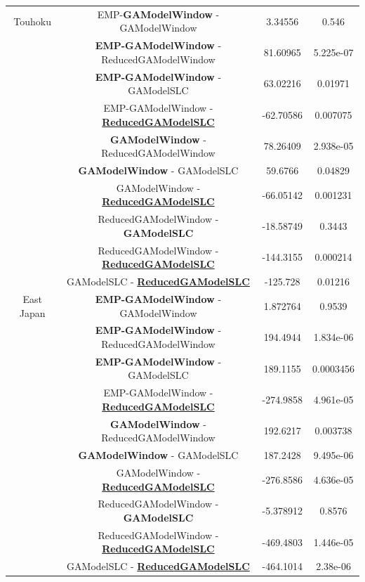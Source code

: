 \begin{table}[!htb]
\begin{center}
\begin{tabular}{|c|c|c|c|}
			\hline
			Touhoku & EMP-\textbf{GAModelWindow} - GAModelWindow &
			3.34556 & 0.546\\
			& \textbf{EMP-GAModelWindow} - ReducedGAModelWindow &
			81.60965 & 5.225e-07\\
			&	\textbf{EMP-GAModelWindow} - GAModelSLC &
			63.02216 &0.01971\\
			& EMP-GAModelWindow - \underline{\textbf{ReducedGAModelSLC}} &
			-62.70586 & 0.007075\\
			& \textbf{GAModelWindow} - ReducedGAModelWindow & 
			78.26409 & 2.938e-05\\
			& \textbf{GAModelWindow} - GAModelSLC &
			59.6766 & 0.04829\\
			& GAModelWindow - \underline{\textbf{ReducedGAModelSLC}} &
			-66.05142 &0.001231\\
			& ReducedGAModelWindow - \textbf{GAModelSLC} &
			-18.58749 & 0.3443\\
			& ReducedGAModelWindow - \underline{\textbf{ReducedGAModelSLC}} &
			-144.3155 & 0.000214\\
			& GAModelSLC - \underline{\textbf{ReducedGAModelSLC}} &
			-125.728 &0.01216\\

			
			\hline
			East Japan & \textbf{EMP-GAModelWindow} - GAModelWindow &
			1.872764  & 0.9539\\

			& \textbf{EMP-GAModelWindow} - ReducedGAModelWindow &
			194.4944 & 1.834e-06\\
			& \textbf{EMP-GAModelWindow} - GAModelSLC &
			189.1155 & 0.0003456\\
			& EMP-GAModelWindow - \underline{\textbf{ReducedGAModelSLC}} &
			-274.9858 & 4.961e-05\\
			& \textbf{GAModelWindow} - ReducedGAModelWindow &
			192.6217 & 0.003738\\
			& \textbf{GAModelWindow} - GAModelSLC &
			187.2428 &9.495e-06\\
			& GAModelWindow - \underline{\textbf{ReducedGAModelSLC}} &
			-276.8586 & 4.636e-05\\
			& ReducedGAModelWindow - \textbf{GAModelSLC} & 
			-5.378912 & 0.8576\\
			& ReducedGAModelWindow - \underline{\textbf{ReducedGAModelSLC}} &
			-469.4803 & 1.446e-05\\
			& GAModelSLC - \underline{\textbf{ReducedGAModelSLC}} &
			-464.1014  & 2.38e-06\\


\end{tabular}
\end{center}
\end{table}
